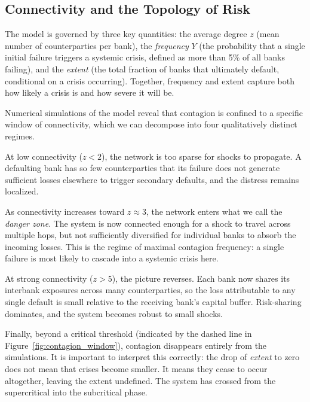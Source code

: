 \documentclass[a4paper,12pt,twoside]{article}
\begin{document}
\subsection{Connectivity and the Topology of Risk}
\label{sec:connectivity}
    \vspace{-0.3cm}

The model is governed by three key quantities: the average degree $z$ 
(mean number of counterparties per bank), the \textit{frequency} $Y$ 
(the probability that a single initial failure triggers a systemic 
crisis, defined as more than 5\% of all banks failing), and the 
\textit{extent} (the total fraction of banks that ultimately default, 
conditional on a crisis occurring). Together, frequency and extent 
capture both how likely a crisis is and how severe it will be.

Numerical simulations of the model reveal that contagion is confined 
to a specific window of connectivity, which we can decompose into four 
qualitatively distinct regimes.

At low connectivity ($z < 2$), the network is too sparse for shocks 
to propagate. A defaulting bank has so few counterparties that its 
failure does not generate sufficient losses elsewhere to trigger 
secondary defaults, and the distress remains localized.

As connectivity increases toward $z \approx 3$, the network enters 
what we call the \textit{danger zone}. The system is now connected 
enough for a shock to travel across multiple hops, but not 
sufficiently diversified for individual banks to absorb the incoming 
losses. This is the regime of maximal contagion frequency: a single 
failure is most likely to cascade into a systemic crisis here.

At strong connectivity ($z > 5$), the picture reverses. Each bank now 
shares its interbank exposures across many counterparties, so the loss 
attributable to any single default is small relative to the receiving 
bank's capital buffer. Risk-sharing dominates, and the system becomes 
robust to small shocks.

Finally, beyond a critical threshold (indicated by the dashed line in 
Figure~\ref{fig:contagion_window}), contagion disappears entirely from 
the simulations. It is important to interpret this correctly: the drop 
of \textit{extent} to zero does not mean that crises become smaller. 
It means they cease to occur altogether, leaving the extent undefined. 
The system has crossed from the supercritical into the subcritical 
phase.
\vspace{-0.4cm}
\end{document}
